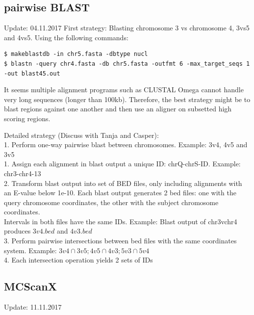\documentclass[10pt,a4paper]{report}
\begin{document}
\subsection{pairwise BLAST}
Update: 04.11.2017
First strategy: Blasting chromosome 3 vs chromosome 4, 3vs5 and 4vs5.
Using the following commands:
\begin{lstlisting}
$ makeblastdb -in chr5.fasta -dbtype nucl
$ blastn -query chr4.fasta -db chr5.fasta -outfmt 6 -max_target_seqs 1 -out blast45.out
\end{lstlisting}

It seems multiple alignment programs such as CLUSTAL Omega cannot handle very long sequences (longer than 100kb). Therefore, the best strategy might be to blast regions against one another and then use an aligner on subsetted high scoring regions.

Detailed strategy (Discuss with Tanja and Casper):\\
1. Perform one-way pairwise blast between chromosomes. Example: 3v4, 4v5 and 3v5\\
1. Assign each alignment in blast output a unique ID: chrQ-chrS-ID. Example: chr3-chr4-13 \\
2. Transform blast output into set of BED files, only including alignments with an E-value below 1e-10. Each blast output generates 2 bed files: one with the query chromosome coordinates, the other with the subject chromosome coordinates.\\ Intervals in both files have the same IDs. Example: Blast output of chr3vchr4 produces $3v4.bed$ and $4v3.bed$\\
3. Perform pairwise intersections between bed files with the same coordinates system. Example: $3v4 \cap 3v5; 4v5  \cap 4v3; 5v3 \cap 5v4$\\
4. Each intersection operation yields 2 sets of IDs
\subsection{MCScanX}
Update: 11.11.2017
\end{document}
